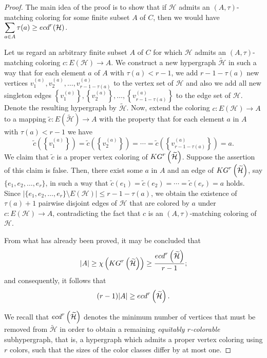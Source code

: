 \documentclass[11pt]{amsart}
\theoremstyle{definition}
\begin{document}
\begin{proof}{
		The main idea of the proof is to show that if ${\mathcal H}$ admits an $(A,\tau)$-matching coloring for some finite subset $A$ of $C$, then we would have $\displaystyle\sum_{a\in A}\tau(a) \geq  {\rm ecd}^r({\mathcal H})$.
		
		Let us regard an arbitrary finite subset $A$ of $C$ for which ${\mathcal H}$ admits an $(A,\tau)$-matching coloring $c: E({\mathcal H})\longrightarrow A$. We construct a new hypergraph $\widetilde{{\mathcal H}}$ in such a way that for each element $a$ of $A$ with $\tau(a) < r-1$, we add $r-1-\tau(a)$ new vertices
		$v^{(a)}_{1},v^{(a)}_{2},\ldots ,v^{(a)}_{r-1-\tau(a)}$ to the vertex set of ${\mathcal H}$ and also we add all new singleton edges $\left\{v^{(a)}_{1}\right\},\left\{v^{(a)}_{2}\right\},\ldots ,\left\{v^{(a)}_{r-1-\tau(a)}\right\}$ to the edge set of ${\mathcal H}$. Denote the resulting hypergraph by $\widetilde{{\mathcal H}}$. Now, extend the coloring $c: E({\mathcal H})\longrightarrow A$ to a mapping $\widetilde{c}: E \left(\widetilde{{\mathcal H}}\right)\longrightarrow A$ with the property that for each element $a$ in $A$ with $\tau(a) < r-1$ we have
		$$\widetilde{c}\left(\left\{v^{(a)}_{1}\right\}\right)=\widetilde{c}\left(\left\{v^{(a)}_{2}\right\}\right)=\cdots =\widetilde{c}\left(\left\{v^{(a)}_{r-1-\tau(a)}\right\}\right)=a.$$
		We claim that $\widetilde{c}$ is a proper vertex coloring of ${\rm KG}^r\left(\widetilde{{\mathcal H}}\right)$.
		Suppose the assertion of this claim is false. Then, there exist some $a$ in $A$ and an edge of ${\rm KG}^r\left(\widetilde{{\mathcal H}}\right)$, say
		$\{e_{1},e_{2},\ldots , e_{r}\}$, in such a way that $\widetilde{c}(e_{1})=\widetilde{c}(e_{2})=\cdots = \widetilde{c}(e_{r}) =a$ holds.
		Since $|\{e_{1},e_{2},\ldots , e_{r}\}\setminus E(\mathcal{H})|\leq r-1-\tau (a)$,
		we obtain the existence of $\tau (a) +1$ pairwise disjoint edges of $\mathcal{H}$ that are colored by $a$ under $c: E({\mathcal H})\longrightarrow A$, contradicting the fact that $c$ is an $(A,\tau)$-matching coloring of $\mathcal{H}$.
		
		From what has already been proved, it may be concluded that 
		$$|A| \geq \chi\left({\rm KG}^r\left(\widetilde{{\mathcal H}}\right)\right)\geq { {\rm ecd}^r\left(\widetilde{{\mathcal H}}\right)\over r-1};$$
		and consequently, it follows that 
		$$(r-1)|A| \geq {\rm ecd}^r\left(\widetilde{{\mathcal H}}\right).$$
		
		We recall that ${\rm ecd}^r\left(\widetilde{{\mathcal H}}\right)$ denotes the minimum number of vertices that must be
		removed from $\widetilde{{\mathcal H}}$ in order to obtain a remaining {\it equitably $r$-colorable} subhypergraph, that is, a hypergraph which admits a proper vertex coloring using $r$ colors, such that the sizes of the color classes differ by at most one.
		
}
\end{proof}
\end{document}
